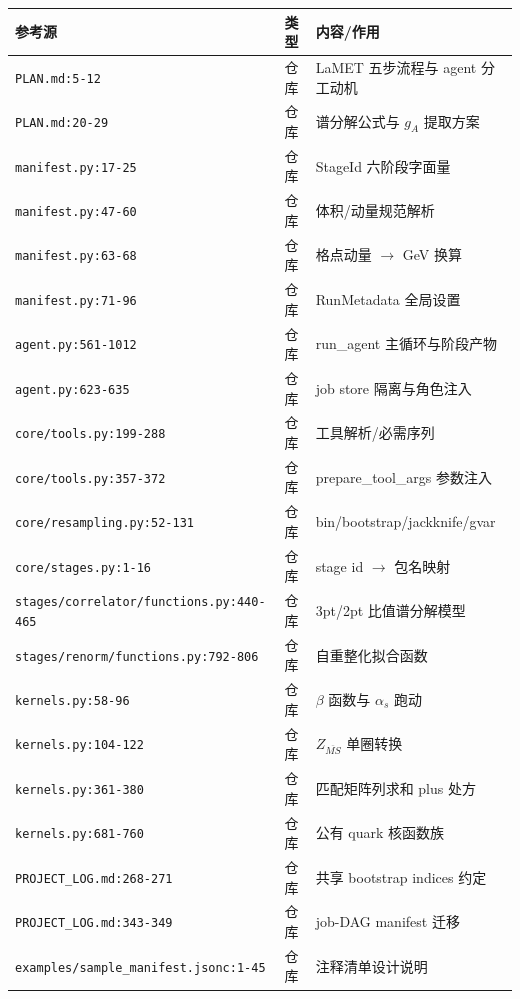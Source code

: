 \documentclass[UTF8]{ctexart}
\begin{document}
\begin{xltabular}{\textwidth}{llX}
\toprule
\textcolor{evidence}{参考源} & 类型 & 内容/作用 \\
\midrule
\endhead
\texttt{\nolinkurl{PLAN.md:5-12}} & 仓库 & LaMET 五步流程与 agent 分工动机 \\
\texttt{\nolinkurl{PLAN.md:20-29}} & 仓库 & 谱分解公式与 $g_A$ 提取方案 \\
\texttt{\nolinkurl{manifest.py:17-25}} & 仓库 & StageId 六阶段字面量 \\
\texttt{\nolinkurl{manifest.py:47-60}} & 仓库 & 体积/动量规范解析 \\
\texttt{\nolinkurl{manifest.py:63-68}} & 仓库 & 格点动量 $\to$ GeV 换算 \\
\texttt{\nolinkurl{manifest.py:71-96}} & 仓库 & RunMetadata 全局设置 \\
\texttt{\nolinkurl{agent.py:561-1012}} & 仓库 & run\_agent 主循环与阶段产物 \\
\texttt{\nolinkurl{agent.py:623-635}} & 仓库 & job store 隔离与角色注入 \\
\texttt{\nolinkurl{core/tools.py:199-288}} & 仓库 & 工具解析/必需序列 \\
\texttt{\nolinkurl{core/tools.py:357-372}} & 仓库 & prepare\_tool\_args 参数注入 \\
\texttt{\nolinkurl{core/resampling.py:52-131}} & 仓库 & bin/bootstrap/jackknife/gvar \\
\texttt{\nolinkurl{core/stages.py:1-16}} & 仓库 & stage id $\to$ 包名映射 \\
\texttt{\nolinkurl{stages/correlator/functions.py:440-465}} & 仓库 & 3pt/2pt 比值谱分解模型 \\
\texttt{\nolinkurl{stages/renorm/functions.py:792-806}} & 仓库 & 自重整化拟合函数 \\
\texttt{\nolinkurl{kernels.py:58-96}} & 仓库 & $\beta$ 函数与 $\alpha_s$ 跑动 \\
\texttt{\nolinkurl{kernels.py:104-122}} & 仓库 & $Z_{\overline{MS}}$ 单圈转换 \\
\texttt{\nolinkurl{kernels.py:361-380}} & 仓库 & 匹配矩阵列求和 plus 处方 \\
\texttt{\nolinkurl{kernels.py:681-760}} & 仓库 & 公有 quark 核函数族 \\
\texttt{\nolinkurl{PROJECT_LOG.md:268-271}} & 仓库 & 共享 bootstrap indices 约定 \\
\texttt{\nolinkurl{PROJECT_LOG.md:343-349}} & 仓库 & job-DAG manifest 迁移 \\
\texttt{\nolinkurl{examples/sample_manifest.jsonc:1-45}} & 仓库 & 注释清单设计说明 \\
\bottomrule
\end{xltabular}
\end{document}
